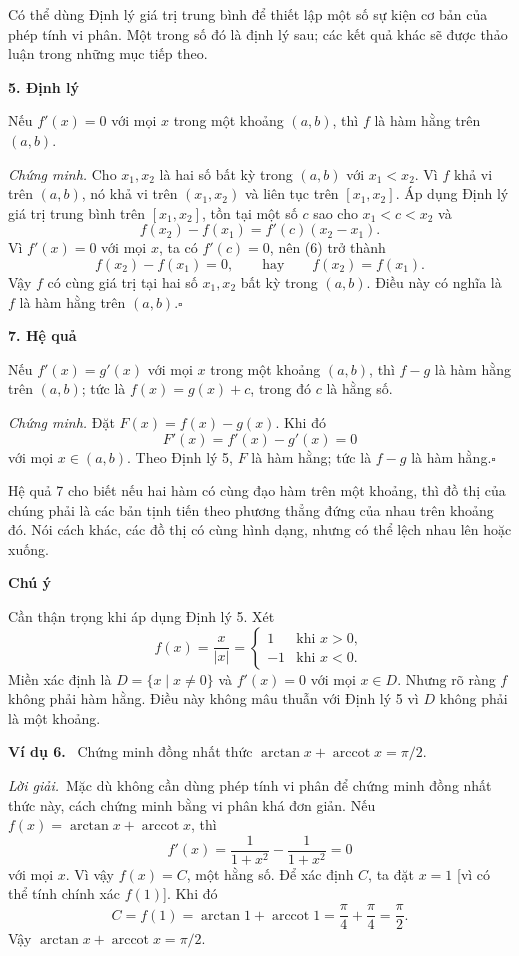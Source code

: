 \documentclass[12pt,a4paper]{article}
\newcommand{\ex}[1]{\par\medskip\noindent\textbf{Ví dụ #1.}\ }
\newcommand{\sol}{\par\nopagebreak[4]\noindent\textit{Lời giải.}\ }
\newcommand{\group}[1]{\par\medskip\noindent\textbf{#1}\par\nopagebreak[4]}
\DeclareMathOperator{\arccot}{arccot}
\begin{document}
Có thể dùng Định lý giá trị trung bình để thiết lập một số sự kiện cơ bản của phép tính vi phân. Một trong số đó là định lý sau; các kết quả khác sẽ được thảo luận trong những mục tiếp theo.
\group{5. Định lý}
Nếu $f'(x)=0$ với mọi $x$ trong một khoảng $(a,b)$, thì $f$ là hàm hằng trên $(a,b)$.
\par\noindent\textit{Chứng minh.} Cho $x_1,x_2$ là hai số bất kỳ trong $(a,b)$ với $x_1<x_2$. Vì $f$ khả vi trên $(a,b)$, nó khả vi trên $(x_1,x_2)$ và liên tục trên $[x_1,x_2]$. Áp dụng Định lý giá trị trung bình trên $[x_1,x_2]$, tồn tại một số $c$ sao cho $x_1<c<x_2$ và
\[f(x_2)-f(x_1)=f'(c)(x_2-x_1).\tag{6}\]
Vì $f'(x)=0$ với mọi $x$, ta có $f'(c)=0$, nên (6) trở thành
\[f(x_2)-f(x_1)=0,\qquad\text{hay}\qquad f(x_2)=f(x_1).\]
Vậy $f$ có cùng giá trị tại hai số $x_1,x_2$ bất kỳ trong $(a,b)$. Điều này có nghĩa là $f$ là hàm hằng trên $(a,b)$.\hfill$\square$
\group{7. Hệ quả}
Nếu $f'(x)=g'(x)$ với mọi $x$ trong một khoảng $(a,b)$, thì $f-g$ là hàm hằng trên $(a,b)$; tức là $f(x)=g(x)+c$, trong đó $c$ là hằng số.
\par\noindent\textit{Chứng minh.} Đặt $F(x)=f(x)-g(x)$. Khi đó
\[F'(x)=f'(x)-g'(x)=0\]
với mọi $x\in(a,b)$. Theo Định lý 5, $F$ là hàm hằng; tức là $f-g$ là hàm hằng.\hfill$\square$

Hệ quả 7 cho biết nếu hai hàm có cùng đạo hàm trên một khoảng, thì đồ thị của chúng phải là các bản tịnh tiến theo phương thẳng đứng của nhau trên khoảng đó. Nói cách khác, các đồ thị có cùng hình dạng, nhưng có thể lệch nhau lên hoặc xuống.
\group{Chú ý}
Cần thận trọng khi áp dụng Định lý 5. Xét
\[f(x)=\frac{x}{|x|}=\begin{cases}1&\text{khi }x>0,\\-1&\text{khi }x<0.\end{cases}\]
Miền xác định là $D=\{x\mid x\ne0\}$ và $f'(x)=0$ với mọi $x\in D$. Nhưng rõ ràng $f$ không phải hàm hằng. Điều này không mâu thuẫn với Định lý 5 vì $D$ không phải là một khoảng.
\ex{6} Chứng minh đồng nhất thức $\arctan x+\arccot x=\pi/2$.
\sol Mặc dù không cần dùng phép tính vi phân để chứng minh đồng nhất thức này, cách chứng minh bằng vi phân khá đơn giản. Nếu $f(x)=\arctan x+\arccot x$, thì
\[f'(x)=\frac1{1+x^2}-\frac1{1+x^2}=0\]
với mọi $x$. Vì vậy $f(x)=C$, một hằng số. Để xác định $C$, ta đặt $x=1$ [vì có thể tính chính xác $f(1)$]. Khi đó
\[C=f(1)=\arctan1+\arccot1=\frac\pi4+\frac\pi4=\frac\pi2.\]
Vậy $\arctan x+\arccot x=\pi/2$.

\clearpage
\end{document}
